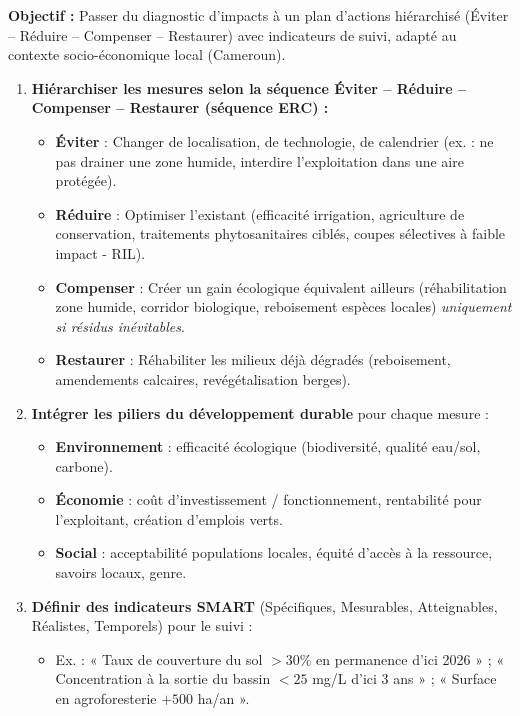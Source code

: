 \documentclass[11pt]{article}
\newcommand{\cle}[1]{{\popxbold\color{popdark}#1}}
\begin{document}
\begin{methode}
    \textbf{Objectif :} Passer du diagnostic d'impacts à un plan d'actions hiérarchisé (Éviter – Réduire – Compenser – Restaurer) avec indicateurs de suivi, adapté au contexte socio-économique local (Cameroun).
    \begin{enumerate}
        \item \textbf{Hiérarchiser les mesures selon la séquence \cle{Éviter – Réduire – Compenser – Restaurer} (séquence ERC) :}
        \begin{itemize}
            \item \textbf{Éviter} : Changer de localisation, de technologie, de calendrier (ex. : ne pas drainer une zone humide, interdire l'exploitation dans une aire protégée).
            \item \textbf{Réduire} : Optimiser l'existant (efficacité irrigation, agriculture de conservation, traitements phytosanitaires ciblés, coupes sélectives à faible impact - RIL).
            \item \textbf{Compenser} : Créer un gain écologique équivalent ailleurs (réhabilitation zone humide, corridor biologique, reboisement espèces locales) \emph{uniquement si résidus inévitables}.
            \item \textbf{Restaurer} : Réhabiliter les milieux déjà dégradés (reboisement, amendements calcaires, revégétalisation berges).
        \end{itemize}
        \item \textbf{Intégrer les piliers du développement durable} pour chaque mesure :
        \begin{itemize}
            \item \textbf{Environnement} : efficacité écologique (biodiversité, qualité eau/sol, carbone).
            \item \textbf{Économie} : coût d'investissement / fonctionnement, rentabilité pour l'exploitant, création d'emplois verts.
            \item \textbf{Social} : acceptabilité populations locales, équité d'accès à la ressource, savoirs locaux, genre.
        \end{itemize}
        \item \textbf{Définir des indicateurs SMART} (Spécifiques, Mesurables, Atteignables, Réalistes, Temporels) pour le suivi :
        \begin{itemize}
            \item Ex. : « Taux de couverture du sol $> 30\%$ en permanence d'ici 2026 » ; « Concentration  à la sortie du bassin $< 25$ mg/L d'ici 3 ans » ; « Surface en agroforesterie $+ 500$ ha/an ».

\end{itemize}
\end{enumerate}
\end{methode}
\end{document}
